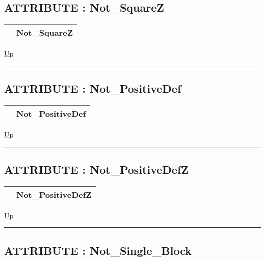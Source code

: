 \subsection*{ATTRIBUTE : Not\_SquareZ}
\hypertarget{ecldoc:pbblas.constants.not_squarez}{}

{\renewcommand{\arraystretch}{1.5}
\begin{tabularx}{\textwidth}{|>{\raggedright\arraybackslash}l|X|}
\hline
\hspace{0pt} & Not\_SquareZ \\
\hline
\end{tabularx}
}

\hyperlink{ecldoc:PBblas.Constants}{Up}

\par


\rule{\textwidth}{0.4pt}
\subsection*{ATTRIBUTE : Not\_PositiveDef}
\hypertarget{ecldoc:pbblas.constants.not_positivedef}{}

{\renewcommand{\arraystretch}{1.5}
\begin{tabularx}{\textwidth}{|>{\raggedright\arraybackslash}l|X|}
\hline
\hspace{0pt} & Not\_PositiveDef \\
\hline
\end{tabularx}
}

\hyperlink{ecldoc:PBblas.Constants}{Up}

\par


\rule{\textwidth}{0.4pt}
\subsection*{ATTRIBUTE : Not\_PositiveDefZ}
\hypertarget{ecldoc:pbblas.constants.not_positivedefz}{}

{\renewcommand{\arraystretch}{1.5}
\begin{tabularx}{\textwidth}{|>{\raggedright\arraybackslash}l|X|}
\hline
\hspace{0pt} & Not\_PositiveDefZ \\
\hline
\end{tabularx}
}

\hyperlink{ecldoc:PBblas.Constants}{Up}

\par


\rule{\textwidth}{0.4pt}
\subsection*{ATTRIBUTE : Not\_Single\_Block}
\hypertarget{ecldoc:pbblas.constants.not_single_block}{}

